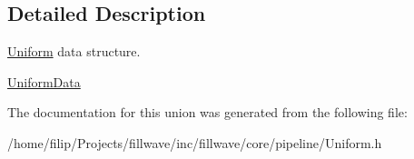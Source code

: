 \subsection{Detailed Description}
\hyperlink{classflw_1_1flc_1_1Uniform}{Uniform} data structure. 

\hyperlink{unionflw_1_1flc_1_1UniformData}{Uniform\+Data} 

The documentation for this union was generated from the following file\+:\begin{DoxyCompactItemize}
\item 
/home/filip/\+Projects/fillwave/inc/fillwave/core/pipeline/Uniform.\+h\end{DoxyCompactItemize}
